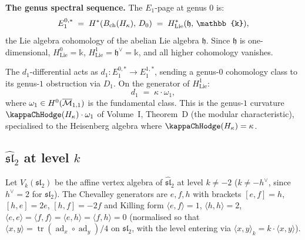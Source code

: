 \begin{example}
\smallskip\noindent
\textbf{The genus spectral sequence.}
The $E_1$-page at genus $0$ is:
\[
E_1^{0,\ast}
\;=\;
H^\ast(\Bch(H_\kappa),\, D_0)
\;=\;
H^\ast_{\mathrm{Lie}}(\mathfrak{h},\, \mathbb{k}),
\]
the Lie algebra cohomology of the abelian Lie algebra
$\mathfrak{h}$. Since $\mathfrak{h}$ is one-dimensional,
$H^0_{\mathrm{Lie}} = \mathbb{k}$,
$H^1_{\mathrm{Lie}} = \mathfrak{h}^\vee = \mathbb{k}$,
and all higher cohomology vanishes.

The $d_1$-differential acts as
$d_1 \colon E_1^{0,\ast} \to E_1^{1,\ast}$, sending a
genus-$0$ cohomology class to its genus-$1$ obstruction via
$D_1$. On the generator of $H^1_{\mathrm{Lie}}$:
\[
d_1 \;=\; \kappa \cdot \omega_1,
\]
where $\omega_1 \in H^0(\overline{\mathcal{M}}_{1,1})$ is the fundamental
class. This is the genus-$1$ curvature
$\kappaChHodge(H_\kappa) \cdot \omega_1$ of Volume~I,
Theorem~D (the modular characteristic), specialised to the Heisenberg
algebra where $\kappaChHodge(H_\kappa) = \kappa$.
\end{example}


\subsection{$\widehat{\mathfrak{sl}}_2$ at level $k$}
\label{subsec:rft-sl2hat}

Let $V_k(\mathfrak{sl}_2)$ be the affine vertex algebra of
$\widehat{\mathfrak{sl}}_2$ at level $k \neq -2$
($k \neq -h^\vee$, since $h^\vee = 2$ for $\mathfrak{sl}_2$).
The Chevalley generators are $e, f, h$ with brackets
$[e, f] = h$, $[h, e] = 2e$, $[h, f] = -2f$
and Killing form
$\langle e, f \rangle = 1$, $\langle h, h \rangle = 2$,
$\langle e, e \rangle = \langle f, f \rangle =
\langle e, h \rangle = \langle f, h \rangle = 0$
(normalised so that $\langle x, y \rangle =
\operatorname{tr}(\operatorname{ad}_x \circ
\operatorname{ad}_y) / 4$ on $\mathfrak{sl}_2$, with the level
entering via $\langle x, y \rangle_k = k \cdot
\langle x, y \rangle$).

